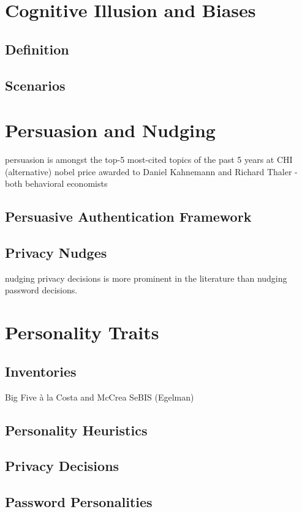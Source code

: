 \section{Cognitive Illusion and Biases}
	\subsection{Definition}
	\subsection{Scenarios}
	
\section{Persuasion and Nudging}

persuasion is amongst the top-5 most-cited topics of the past 5 years at CHI
(alternative) nobel price awarded to Daniel Kahnemann and Richard Thaler - both behavioral economists

	\subsection{Persuasive Authentication Framework}
	\subsection{Privacy Nudges}
	nudging privacy decisions is more prominent in the literature than nudging password decisions. 

\section{Personality Traits}
	\subsection{Inventories}
	Big Five à la Costa and McCrea \cite{Costa1992NEO}
	SeBIS (Egelman)
	\subsection{Personality Heuristics}	
	\subsection{Privacy Decisions}
	\subsection{Password Personalities}

